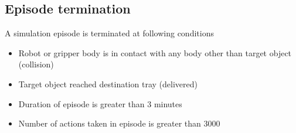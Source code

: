 \subsection{Episode termination}
A simulation episode is terminated at following conditions
\begin{itemize}
	\item Robot or gripper body is in contact with any body other than target object (collision)
	\item Target object reached destination tray (delivered)
	\item Duration of episode is greater than 3 minutes
	\item Number of actions taken in episode is greater than 3000
\end{itemize}
